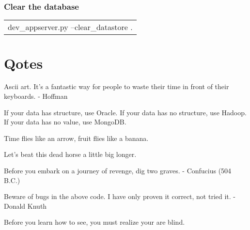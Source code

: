 \documentclass[12pt]{article}
\begin{document}
\subsubsection{Clear the database}

\begin{tabular}{l}
dev\_appserver.py --clear\_datastore .
\end{tabular}



\section{Qotes}

Ascii art. It's a fantastic way for people to waste their time in front of their keyboards. - Hoffman

If your data has structure, use Oracle. If your data has no structure, use Hadoop. If your data has no value, use MongoDB.

Time flies like an arrow, fruit flies like a banana.

Let's beat this dead horse a little big longer.

Before you embark on a journey of revenge, dig two graves. - Confucius (504 B.C.)

Beware of bugs in the above code. I have only proven it correct, not tried it. - Donald Knuth

Before you learn how to see, you must realize your are blind.





\printindex
\end{document}

